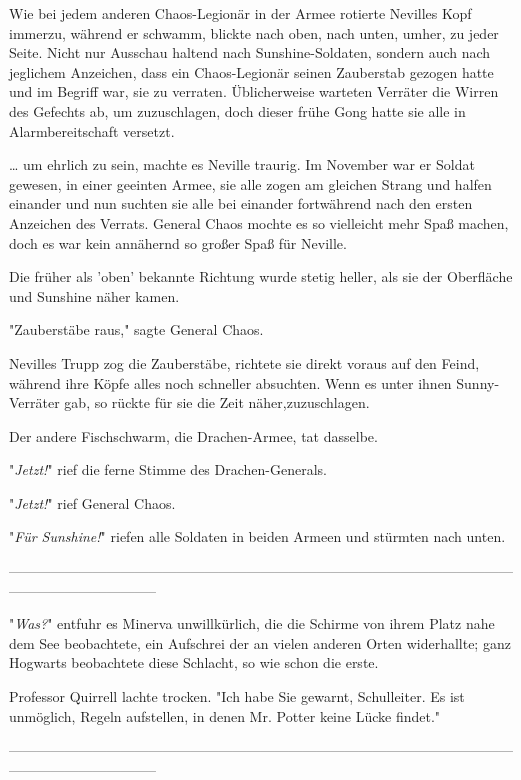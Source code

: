 {Wie bei jedem anderen Chaos-Legionär in der Armee rotierte Nevilles Kopf immerzu, während er schwamm, blickte nach oben, nach unten, umher, zu jeder Seite. Nicht nur Ausschau haltend nach Sunshine-Soldaten, sondern auch nach jeglichem Anzeichen, dass ein Chaos-Legionär seinen Zauberstab gezogen hatte und im Begriff war, sie zu verraten. Üblicherweise warteten Verräter die Wirren des Gefechts ab, um zuzuschlagen, doch dieser frühe Gong hatte sie alle in Alarmbereitschaft versetzt.

… um ehrlich zu sein, machte es Neville traurig. Im November war er Soldat gewesen, in einer geeinten Armee, sie alle zogen am gleichen Strang und halfen einander und nun suchten sie alle bei einander fortwährend nach den ersten Anzeichen des Verrats. General Chaos mochte es so vielleicht mehr Spaß machen, doch es war kein annähernd so großer Spaß für Neville.

Die früher als 'oben' bekannte Richtung wurde stetig heller, als sie der Oberfläche und Sunshine näher kamen.

"Zauberstäbe raus," sagte General Chaos.

Nevilles Trupp zog die Zauberstäbe, richtete sie direkt voraus auf den Feind, während ihre Köpfe alles noch schneller absuchten. Wenn es unter ihnen Sunny-Verräter gab, so rückte für sie die Zeit näher,zuzuschlagen.

Der andere Fischschwarm, die Drachen-Armee, tat dasselbe.

"\emph{Jetzt!}" rief die ferne Stimme des Drachen-Generals.

"\emph{Jetzt!}" rief General Chaos.

"\emph{Für Sunshine!}" riefen alle Soldaten in beiden Armeen und stürmten nach unten.

--------------------------------------------------------------------------------------------------------------------------------------------

"\emph{Was?}" entfuhr es Minerva unwillkürlich, die die Schirme von ihrem Platz nahe dem See beobachtete, ein Aufschrei der an vielen anderen Orten widerhallte; ganz Hogwarts beobachtete diese Schlacht, so wie schon die erste.

Professor Quirrell lachte trocken. "Ich habe Sie gewarnt, Schulleiter. Es ist unmöglich, Regeln aufstellen, in denen Mr. Potter keine Lücke findet."

--------------------------------------------------------------------------------------------------------------------------------------------

}
